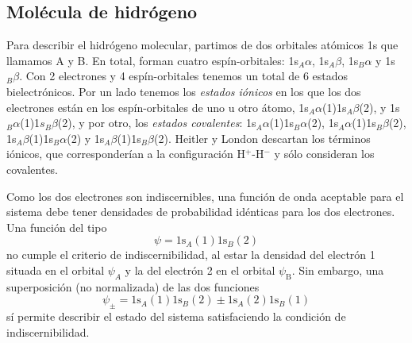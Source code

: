 \documentclass{tufte-handout}
\begin{document}
\subsection{Molécula de hidrógeno}
Para describir el hidrógeno molecular, partimos de dos orbitales atómicos 1s que llamamos A y B.
En total, forman cuatro espín-orbitales: 1s$_A\alpha$, 
1s$_A\beta$, 1s$_B\alpha$ y 1s$_B\beta$. 
Con 2 electrones y 4 espín-orbitales tenemos un total de 6 estados
bielectrónicos. Por un lado tenemos los \textit{estados 
iónicos} en los que los dos electrones  están en los
espín-orbitales de uno u otro átomo, 
1s$_A\alpha$(1)1s$_A\beta$(2),
y 1s$_B\alpha$(1)1$s_B\beta$(2), 
y por otro, los \textit{estados covalentes}:
1s$_A\alpha$(1)1s$_B\alpha$(2), 1s$_A\alpha$(1)1s$_B\beta$(2), 
1s$_A\beta$(1)1s$_B\alpha$(2) y 1s$_A\beta$(1)1s$_B\beta$(2).
Heitler y London descartan los términos iónicos, que 
corresponderían a la configuración H$^+$-H$^-$ y sólo 
consideran los covalentes.

Como los dos electrones son indiscernibles, una función de onda
aceptable para el sistema debe tener densidades de probabilidad 
idénticas para los dos electrones. Una función del tipo
\begin{equation}
    \psi=\mathrm{1s}_A(1)\mathrm{1s}_B(2)
\end{equation}
no cumple el criterio de indiscernibilidad, al estar la densidad
del electrón 1 situada en el orbital $\psi_A$ y la del electrón
2 en el orbital $\psi_\mathrm{B}$. Sin embargo, una
superposición (no normalizada) de las dos funciones 
\begin{equation}
    \psi_\pm=\mathrm{1s}_A(1)\mathrm{1s}_B(2) \pm
    \mathrm{1s}_A(2)\mathrm{1s}_B(1)
\end{equation}
sí permite describir el estado del sistema satisfaciendo la 
condición de indiscernibilidad. 
\end{document}

